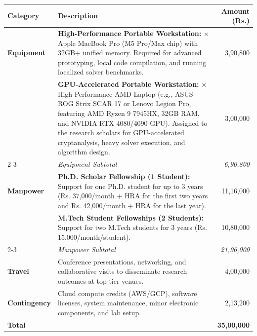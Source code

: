 	\begin{table}[htbp]
		\centering
		
		\renewcommand{\arraystretch}{1.3}
		\begin{tabular}{@{} l p{10cm} r @{}}
			\hline
			\textbf{Category} & \textbf{Description} & \textbf{Amount (Rs.)} \\
			\hline
			\textbf{Equipment}
			& \textbf{High-Performance Portable Workstation:} \newline 1 $\times$ Apple MacBook Pro (M5 Pro/Max chip) with 32GB+ unified memory. Required for advanced prototyping, local code compilation, and running localized solver benchmarks. & 3,90,800 \\
			& \textbf{GPU-Accelerated Portable Workstation:} \newline 1 $\times$ High-Performance AMD Laptop (e.g., ASUS ROG Strix SCAR 17 or Lenovo Legion Pro, featuring AMD Ryzen 9 7945HX, 32GB RAM, and NVIDIA RTX 4080/4090 GPU). Assigned to the research scholars for GPU-accelerated cryptanalysis, heavy solver execution, and algorithm design. & 3,00,000 \\
			\cline{2-3}
			& \textit{Equipment Subtotal} & \textit{6,90,800} \\
			\hline
			\textbf{Manpower}
			& \textbf{Ph.D. Scholar Fellowship (1 Student):} \newline Support for one Ph.D. student for up to 3 years (Rs. 37,000/month + HRA for the first two years and Rs. 42,000/month + HRA for the last year). & 11,16,000 \\
			& \textbf{M.Tech Student Fellowships (2 Students):} \newline Support for two M.Tech students for 3 years (Rs. 15,000/month/student). & 10,80,000 \\
			\cline{2-3}
			& \textit{Manpower Subtotal} & \textit{21,96,000} \\
			\hline
			\textbf{Travel} & Conference presentations, networking, and collaborative visits to disseminate research outcomes at top-tier venues. & 4,00,000 \\
			\hline
			\textbf{Contingency} & Cloud compute credits (AWS/GCP), software licenses, system maintenance, minor electronic components, and lab setup. & 2,13,200 \\
			\hline
			\textbf{Total} & & \textbf{35,00,000} \\
			\hline
		\end{tabular}

\end{table}
